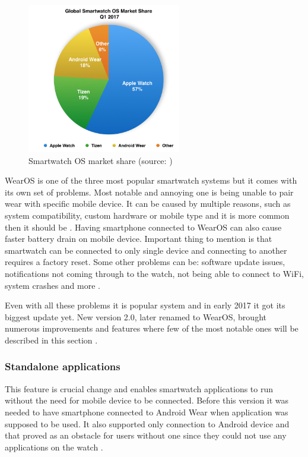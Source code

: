 \begin{figure}[H]
	\begin{centering}
		\includegraphics[width=0.6\textwidth]{img/wear_market_share}
		\par\end{centering}
	\caption{Smartwatch OS market share (source: \cite{TOAW})\label{fig:SmartwatchOSMarketShare}}
	\label{fig02c04}
\end{figure}

WearOS is one of the three most popular smartwatch systems but it comes with its own set of problems. Most notable and annoying one is being unable to pair wear with specific mobile device. It can be caused by multiple reasons, such as system compatibility, custom hardware or mobile type and it is more common then it should be \cite{AWPaS}. Having smartphone connected to WearOS can also cause faster battery drain on mobile device. Important thing to mention is that smartwatch can be connected to only single device and connecting to another requires a factory reset. Some other problems can be: software update issues, notifications not coming through to the watch, not being able to connect to WiFi, system crashes and more \cite{WAWP}.

Even with all these problems it is popular system and in early 2017 it got its biggest update yet. New version 2.0, later renamed to WearOS, brought numerous improvements and features where few of the most notable ones will be described in this section \cite{AW2UG, AW2WN, AW2N}.

\subsubsection{Standalone applications}\label{sec:StandaloneApplications}
This feature is crucial change and enables smartwatch applications to run without the need for mobile device to be connected. Before this version it was needed to have smartphone connected to Android Wear when application was supposed to be used. It also supported only connection to Android device and that proved as an obstacle for users without one since they could not use any applications on the watch \cite{AW2UG, AW2WN}.

